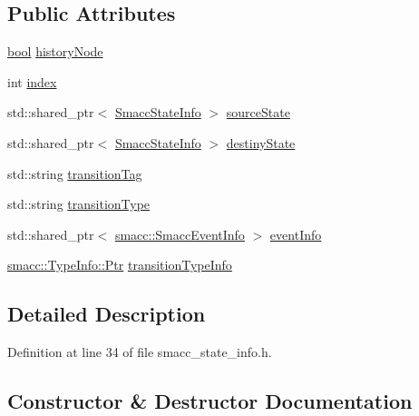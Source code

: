 \subsection*{Public Attributes}
\begin{DoxyCompactItemize}
\item 
\hyperlink{classbool}{bool} \hyperlink{structsmacc_1_1SmaccTransitionInfo_a3e904998932b58d36a2995982d36cf68}{history\+Node}
\item 
int \hyperlink{structsmacc_1_1SmaccTransitionInfo_a629160558f789d6812c7edd54707e053}{index}
\item 
std\+::shared\+\_\+ptr$<$ \hyperlink{classsmacc_1_1SmaccStateInfo}{Smacc\+State\+Info} $>$ \hyperlink{structsmacc_1_1SmaccTransitionInfo_a959ee5f468cba2f7b19e4d35f94cc564}{source\+State}
\item 
std\+::shared\+\_\+ptr$<$ \hyperlink{classsmacc_1_1SmaccStateInfo}{Smacc\+State\+Info} $>$ \hyperlink{structsmacc_1_1SmaccTransitionInfo_a3deee8ced495b363eeca7f0e53d9a5af}{destiny\+State}
\item 
std\+::string \hyperlink{structsmacc_1_1SmaccTransitionInfo_ae9690118ca428a62997043135106de6b}{transition\+Tag}
\item 
std\+::string \hyperlink{structsmacc_1_1SmaccTransitionInfo_a0d0954ea8c789c13ab226617d257906b}{transition\+Type}
\item 
std\+::shared\+\_\+ptr$<$ \hyperlink{structsmacc_1_1SmaccEventInfo}{smacc\+::\+Smacc\+Event\+Info} $>$ \hyperlink{structsmacc_1_1SmaccTransitionInfo_af5a6bb0957a17556f96bad8e00bc7a23}{event\+Info}
\item 
\hyperlink{classsmacc_1_1TypeInfo_aca0cd51c7c9ef85f6c98dc32878af226}{smacc\+::\+Type\+Info\+::\+Ptr} \hyperlink{structsmacc_1_1SmaccTransitionInfo_acce805ee4d76ea1e76088d776f44b517}{transition\+Type\+Info}
\end{DoxyCompactItemize}


\subsection{Detailed Description}


Definition at line 34 of file smacc\+\_\+state\+\_\+info.\+h.



\subsection{Constructor \& Destructor Documentation}

